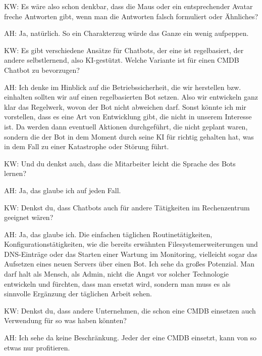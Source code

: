 \begin{list}{X:}{\setlength{\labelsep}{5mm}}
\item [KW:] Es wäre also schon denkbar, dass die Maus oder ein entsprechender Avatar freche Antworten gibt, wenn man die Antworten falsch formuliert oder Ähnliches? 
\item [AH:] Ja, natürlich. So ein Charakterzug würde das Ganze ein wenig aufpeppen.
\item [KW:] Es gibt verschiedene Ansätze für Chatbots, der eine ist regelbasiert, der andere selbstlernend, also KI-gestützt. Welche Variante ist für einen CMDB Chatbot zu bevorzugen?
\item [AH:] Ich denke im Hinblick auf die Betriebssicherheit, die wir herstellen bzw. einhalten sollten wir auf einen regelbasierten Bot setzen. Also wir entwickeln ganz klar das Regelwerk, wovon der Bot nicht abweichen darf. Sonst könnte ich mir vorstellen, dass es eine Art von Entwicklung gibt, die nicht in unserem Interesse ist. Da werden dann eventuell Aktionen durchgeführt, die nicht geplant waren, sondern die der Bot in dem Moment durch seine KI für richtig gehalten hat, was in dem Fall zu einer Katastrophe oder Störung führt.
\item [KW:] Und du denkst auch, dass die Mitarbeiter leicht die Sprache des Bots lernen?
\item [AH:] Ja, das glaube ich auf jeden Fall.
\item [KW:] Denkst du, dass Chatbots auch für andere Tätigkeiten im Rechenzentrum geeignet wären?
\item [AH:] Ja, das glaube ich. Die einfachen täglichen Routinetätigkeiten, Konfigurationstätigkeiten, wie die bereits erwähnten Filesystemerweiterungen und DNS-Einträge oder das Starten einer Wartung im Monitoring, vielleicht sogar das Aufsetzen eines neuen Servers über einen Bot. Ich sehe da großes Potenzial. Man darf halt als Mensch, als Admin, nicht die Angst vor solcher Technologie entwickeln und fürchten, dass man ersetzt wird, sondern man muss es als sinnvolle Ergänzung der täglichen Arbeit sehen.
\item [KW:] Denkst du, dass andere Unternehmen, die schon eine CMDB einsetzen auch Verwendung für so was haben könnten?
\item [AH:] Ich sehe da keine Beschränkung. Jeder der eine CMDB einsetzt, kann von so etwas nur profitieren.
\end{list}
